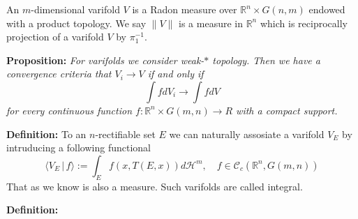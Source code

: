 An $m$-dimensional varifold $V$ is a Radon measure over $\mathbb{R}^n\times
G(n,m)$ endowed with a product topology. We say $\|V\|$ is a measure in
$\mathbb{R}^n$ which is reciprocally projection of a varifold $V$ by $\pi_1^{-1}$.

\vspace{2ex}
\textbf{Proposition:} \textit{For varifolds we consider weak-$*$ topology. Then we have a
convergence criteria that $V_i\rightarrow V$ if and only if
\[\int fdV_i\rightarrow\int fdV\]
for every continuous function $f:\mathbb{R}^n\times G(m,n)\rightarrow R$ with a
compact support.}

\vspace{2ex}
\textbf{Definition:} To an $n$-rectifiable set $E$ we can naturally assosiate
a varifold $V_E$ by intruducing a following functional
\[\langle V_E\,|\, f\rangle:=\int_Ef(x,T(E,x))d\mathcal H^m,\quad f\in\mathcal C_c(\mathbb R^n, G(m,n))\]
That as we know is also a measure. Such varifolds are called integral.

\vspace{2ex}
\textbf{Definition:}
